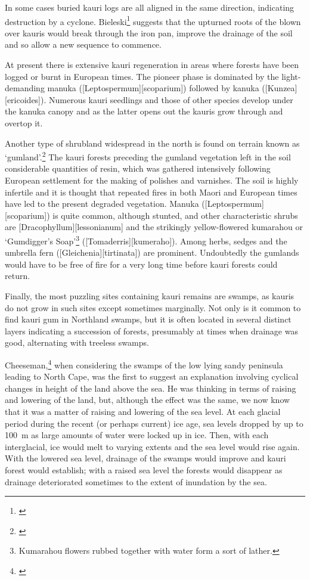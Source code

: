 In some cases buried kauri logs are all aligned in the same direction, indicating destruction by a cyclone.
Bieleski\footnote{\cite{bieleski1959factors}} suggests that the upturned roots of the blown over kauris would break through the iron pan, improve the drainage of the soil and so allow a new sequence to commence.

At present there is extensive kauri regeneration in areas where forests have been logged or burnt in European times.
The pioneer phase is dominated by the light-demanding manuka ([Leptospermum][scoparium]) followed by kanuka ([Kunzea][ericoides]).
Numerous kauri seedlings and those of other species develop under the kanuka canopy and as the latter opens out the kauris grow through and overtop it.

Another type of shrubland widespread in the north is found on terrain known as `gumland'.\footnote{\cite{esler1975gumland}}
The kauri forests preceding the gumland vegetation left in the soil considerable quantities of resin, which was gathered intensively following European settlement for the making of polishes and varnishes.
The soil is highly infertile and it is thought that repeated fires in both Maori and European times have led to the present degraded vegetation.
Manuka ([Leptospermum][scoparium]) is quite common, although stunted, and other characteristic shrubs are [Dracophyllum][lessonianum] and the strikingly yellow-flowered kumarahou or `Gumdigger's Soap'\footnote{Kumarahou flowers rubbed together with water form a sort of lather.} ([Tomaderris][kumeraho]).
Among herbs, sedges and the umbrella fern ([Gleichenia][tirtinata]) are prominent.
Undoubtedly the gumlands would have to be free of fire for a very long time before kauri forests could return.

Finally, the most puzzling sites containing kauri remains are swamps, as kauris do not grow in such sites except sometimes marginally.
Not only is it common to find kauri gum in Northland swamps, but it is often located in several distinct layers indicating a succession of forests, presumably at times when drainage was good, alternating with treeless swamps.

Cheeseman,\footnote{\cite{cheeseman1896flora}} when considering the swamps of the low lying sandy peninsula leading to North Cape, was the first to suggest an explanation involving cyclical changes in height of the land above the sea.
He was thinking in terms of raising and lowering of the land, but, although the effect was the same, we now know that it was a matter of raising and lowering of the sea level.
At each glacial period during the recent (or perhaps current) ice age, sea levels dropped by up to \SI{100}{\metre} as large amounts of water were locked up in ice.
Then, with each interglacial, ice would melt to varying extents and the sea level would rise again.
With the lowered sea level, drainage of the swamps would improve and kauri forest would establish; with a raised sea level the forests would disappear as drainage deteriorated sometimes to the extent of inundation by the sea.

